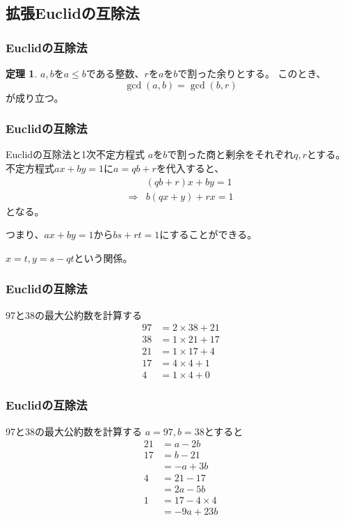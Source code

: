\documentclass[aspectratio=169,dvipdfmx,14pt,notheorems]{beamer}
\theoremstyle{definition}
\newtheorem{theorem}{定理}
\begin{document}
\subsection{拡張Euclidの互除法}

\begin{frame}[fragile]\frametitle{Euclidの互除法}
\begin{theorem}
$a, b$を$a \leq b$である整数、$r$を$a$を$b$で割った余りとする。
このとき、
\begin{equation*}
\gcd(a, b) = \gcd(b, r)
\end{equation*}
が成り立つ。
\end{theorem}
\end{frame}

\begin{frame}[fragile]\frametitle{Euclidの互除法}
\begin{block}{Euclidの互除法と1次不定方程式}
$a$を$b$で割った商と剰余をそれぞれ$q, r$とする。
不定方程式$ax+by=1$に$a = qb + r$を代入すると、
\begin{align*}
& (qb + r)x + by = 1 \\
\Rightarrow & b(qx + y) + rx = 1
\end{align*}
となる。
\end{block}
つまり、$ax+by=1$から$bs + rt = 1$にすることができる。

$x=t, y = s - qt$という関係。
\end{frame}

\begin{frame}[fragile]\frametitle{Euclidの互除法}
\begin{exampleblock}{97と38の最大公約数を計算する}
\begin{align*}
97 &= 2 \times 38 + 21 \\
38 &= 1 \times 21 + 17 \\
21 &= 1 \times 17 + 4 \\
17 &= 4 \times 4 + 1 \\
4 &= 1 \times 4 + 0
\end{align*}
\end{exampleblock}
\end{frame}

\begin{frame}[fragile]\frametitle{Euclidの互除法}
\begin{exampleblock}{97と38の最大公約数を計算する}
$a=97, b=38$とすると
\begin{align*}
21 &= a -2b \\
17 &= b -21 \\
     &= -a + 3b \\
4   &= 21 - 17 \\
     &= 2a - 5b \\
1 &= 17 - 4 \times 4 \\
   &= -9a + 23b
\end{align*}
\end{exampleblock}
\end{frame}
\end{document}
